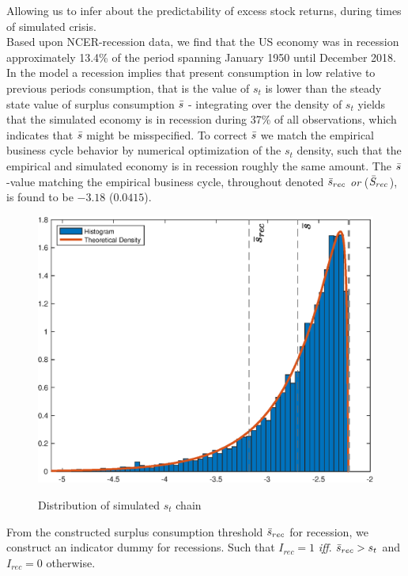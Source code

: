 Allowing us to infer about the predictability of excess stock returns, during times of simulated crisis. 
\newline
\\
Based upon NCER-recession data, we find that the US economy was in recession approximately 13.4\% of the period spanning January 1950 until December 2018.  In the model a recession implies that present consumption in low relative to previous periods consumption, that is the value of $s_t$ is lower than the steady state value of surplus consumption $\Bar{s}$ - integrating over the density of $s_t$ yields that the simulated economy is in recession during 37\% of all observations, which indicates that $\Bar{s}$ might be misspecified. To correct $\Bar{s}$ we match the empirical business cycle behavior by numerical optimization of the $s_t$ density, such that the empirical and simulated economy is in recession roughly the same amount. The $\Bar{s}$-value matching the empirical business cycle, throughout denoted $\Bar{s}_{rec}$ \textit{or} ($\Bar{S}_{rec}$), is found to be $-3.18$ ($0.0415$).





\begin{figure}[H]
    \centering
    \caption{Distribution of simulated $s_t$ chain}
    \includegraphics[width=\textwidth]{Figures/DistributionS_t.eps}
    \label{fig:DistriSt}
\end{figure}
From the constructed surplus consumption threshold $\Bar{s}_{rec}$ for recession, we construct an indicator dummy for recessions. Such that $I_{rec} = 1$ \textit{iff}. $\Bar{s}_{rec} > s_t$ and $I_{rec}=0$ otherwise.

